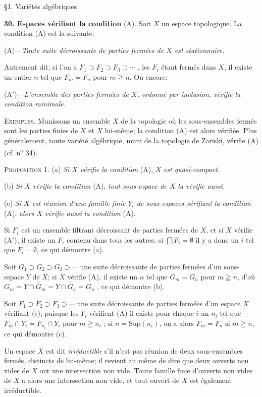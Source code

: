 \S1. Variétés algébriques

\textbf{30. Espaces vérifiant la condition} (A). Soit $X$ un espace topologique. La condition (A) est la suivante:

(A)---\textit{Toute suite décroissante de parties fermées de $X$ est stationnaire.}

Autrement dit, si l'on a $F_1 \supset F_2 \supset F_3 \supset \cdots$ , les $F_i$ étant fermés dans $X$, il existe un entier $n$ tel que $F_m = F_n$ pour $m \geqq n$. Ou encore:

(A$'$)---\textit{L'ensemble des parties fermées de $X$, ordonné par inclusion, vérifie la condition minimale.}

\textsc{Exemples}. Munissons un ensemble $X$ de la topologie où les sous-ensembles fermés sont les parties finies de $X$ et $X$ lui-même; la condition (A) est alors vérifiée. Plus généralement, toute variété algébrique, muni de la topologie de Zariski, vérifie (A) (cf. n\textsuperscript{o} 34).

\textsc{Proposition} 1. (a) \textit{Si $X$ vérifie la condition} (A), $X$ \textit{est quasi-compact.}

(b) \textit{Si $X$ vérifie la condition} (A), \textit{tout sous-espace de $X$ la vérifie aussi.}

(c) \textit{Si $X$ est réunion d'une famille finie $Y_i$ de sous-espaces vérifiant la condition} (A), \textit{alors $X$ vérifie aussi la condition} (A).

Si $F_i$ est un ensemble filtrant décroissant de parties fermées de $X$, et si $X$ vérifie (A$'$), il existe un $F_i$ contenu dans tous les autres; si $\bigcap F_i = \emptyset$ il y a donc un $i$ tel que $F_i = \emptyset$, ce qui démontre (a).

Soit $G_1 \supset G_2 \supset G_3 \supset \cdots$ une suite décroissante de parties fermées d'un sous-espace $Y$ de $X$; si $X$ vérifie (A), il existe un $n$ tel que $\bar{G}_m = \bar{G}_n$ pour $m \geqq n$, d'où $G_m = Y \cap \bar{G}_m = Y \cap \bar{G}_n = G_n$ , ce qui démontre (b).

Soit $F_1 \supset F_2 \supset F_3 \supset \cdots$ une suite décroissante de parties fermées d'un espace $X$ vérifiant (c); puisque les $Y_i$ vérifient (A) il existe pour chaque $i$ un $n_i$ tel que $F_m \cap Y_i = F_{n_i} \cap Y_i$ pour $m \geqq n_i$ ; si $n = \mathrm{Sup}(n_i)$, on a alors $F_m = F_n$ si $m \geqq n$, ce qui démontre (c).

Un espace $X$ est dit \textit{irréductible} s'il n'est pas réunion de deux sous-ensembles fermés, distincts de lui-même; il revient au même de dire que deux ouverts non vides de $X$ ont une intersection non vide. Toute famille finie d'ouverts non vides de $X$ a alors une intersection non vide, et tout ouvert de $X$ est également irréductible.

